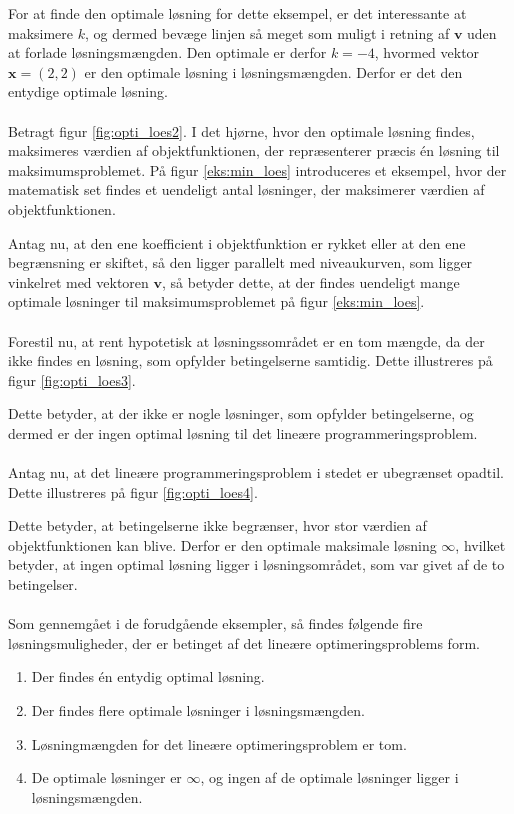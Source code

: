 \begin{eks}
For at finde den optimale løsning for dette eksempel, er det interessante at maksimere $k$, og dermed bevæge linjen så meget som muligt i retning af $\textbf{v}$ uden at forlade løsningsmængden. Den optimale er derfor $k = -4$, hvormed vektor $\textbf{x}=(2,2)$ er den optimale løsning i løsningsmængden. Derfor er det den entydige optimale løsning. 
\\\\
%
%
Betragt figur \ref{fig:opti_loes2}. 
I det hjørne, hvor den optimale løsning findes, maksimeres værdien af objektfunktionen, der repræsenterer præcis én løsning til maksimumsproblemet. 
På figur \ref{eks:min_loes} introduceres et eksempel, hvor der matematisk set findes et uendeligt antal løsninger, der
maksimerer værdien af objektfunktionen.
%

%
\noindent
Antag nu, at den ene koefficient i objektfunktion er rykket eller at den ene begrænsning er skiftet, så den ligger parallelt med niveaukurven, som ligger vinkelret med vektoren $\textbf{v}$, så betyder dette, at der findes uendeligt mange optimale løsninger til maksimumsproblemet på figur \ref{eks:min_loes}. 
\\\\
%
Forestil nu, at rent hypotetisk at løsningssområdet er en tom
mængde, da der ikke findes en løsning, som opfylder betingelserne samtidig. 
Dette illustreres på figur \ref{fig:opti_loes3}.
%

%
\noindent
Dette betyder, at der ikke er nogle løsninger, som opfylder betingelserne, og dermed er der ingen optimal løsning til det lineære programmeringsproblem. 
\\\\
%
Antag nu, at det lineære programmeringsproblem i stedet er ubegrænset opadtil.
Dette illustreres på figur \ref{fig:opti_loes4}.
%

%
\noindent
%
Dette betyder, at betingelserne ikke begrænser, hvor stor
værdien af objektfunktionen kan blive. 
Derfor er den optimale maksimale løsning $\infty$, hvilket betyder, at ingen optimal løsning ligger i løsningsområdet, som var givet af de to betingelser. 
\\\\
%
Som gennemgået i de forudgående eksempler, så findes følgende fire løsningsmuligheder, der er betinget af det lineære optimeringsproblems form.
%
\begin{enumerate}
\item Der findes én entydig optimal løsning.
\item Der findes flere optimale løsninger i løsningsmængden.
\item Løsningmængden for det lineære optimeringsproblem er tom. 
\item De optimale løsninger er $\infty$, og ingen af de optimale løsninger ligger i løsningsmængden.
\end{enumerate}
%
\end{eks}